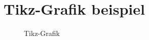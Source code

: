 \section{Tikz-Grafik beispiel}
\begin{figure}[ht]
    \centering
    
    \caption{Tikz-Grafik}
    \label{fig:Tikzbeispiel}
\end{figure}
